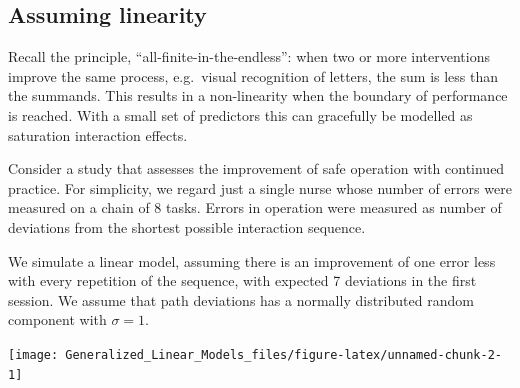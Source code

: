 \documentclass[]{svmono}
\newenvironment{Shaded}{\begin{snugshade}}{\end{snugshade}}
\newcommand{\KeywordTok}[1]{\textcolor[rgb]{0.13,0.29,0.53}{\textbf{#1}}}
\newcommand{\DataTypeTok}[1]{\textcolor[rgb]{0.13,0.29,0.53}{#1}}
\newcommand{\DecValTok}[1]{\textcolor[rgb]{0.00,0.00,0.81}{#1}}
\newcommand{\FloatTok}[1]{\textcolor[rgb]{0.00,0.00,0.81}{#1}}
\newcommand{\StringTok}[1]{\textcolor[rgb]{0.31,0.60,0.02}{#1}}
\newcommand{\OperatorTok}[1]{\textcolor[rgb]{0.81,0.36,0.00}{\textbf{#1}}}
\newcommand{\NormalTok}[1]{#1}
\begin{document}
\subsection{Assuming linearity}\label{assuming-linearity}

Recall the principle, ``all-finite-in-the-endless'': when two or more
interventions improve the same process, e.g.~visual recognition of
letters, the sum is less than the summands. This results in a
non-linearity when the boundary of performance is reached. With a small
set of predictors this can gracefully be modelled as saturation
interaction effects.

Consider a study that assesses the improvement of safe operation with
continued practice. For simplicity, we regard just a single nurse whose
number of errors were measured on a chain of 8 tasks. Errors in
operation were measured as number of deviations from the shortest
possible interaction sequence.

We simulate a linear model, assuming there is an improvement of one
error less with every repetition of the sequence, with expected 7
deviations in the first session. We assume that path deviations has a
normally distributed random component with \(\sigma = 1\).

\begin{Shaded}
\end{Shaded}

\texttt{[image: Generalized\_Linear\_Models\_files/figure-latex/unnamed-chunk-2-1]}
\end{document}
